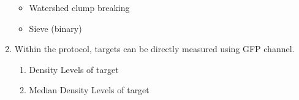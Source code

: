 \begin{enumerate}
  \begin{itemize}
  \item Watershed clump breaking
  \item Sieve (binary)
  \end{itemize}
  \begin{figure}[!ht]
    \centering
  \end{figure}
  \pagebreak
\item Within the protocol, targets can be directly measured using GFP channel.
  \begin{enumerate}
  \item Density Levels of target
  \item Median Density Levels of target

\end{enumerate}
\end{enumerate}
